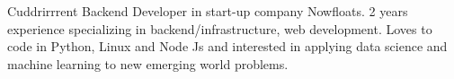 

\begin{cvparagraph}

Cuddrirrrent Backend Developer in start-up company Nowfloats. 2 years experience specializing in backend/infrastructure, web development. Loves to code in Python, Linux and Node Js and interested in applying data science and machine learning to new emerging world problems. 
\end{cvparagraph}
